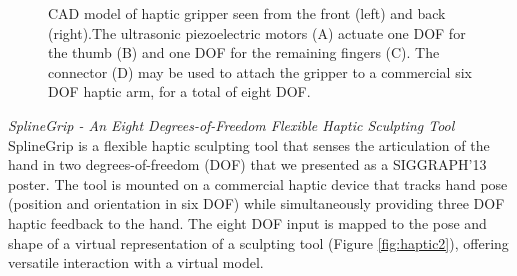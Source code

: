 \begin{enumerate}
{\begin{figure}[!h]
\centering
{}
\caption{\label{fig:haptic1} CAD model of haptic gripper seen from the front (left) and back (right).The ultrasonic piezoelectric motors (A) actuate one DOF for the thumb (B) and one DOF for the remaining fingers (C). The connector (D) may be used to attach the gripper to a commercial six DOF haptic arm, for a total of eight DOF.} 
\end{figure}

\textit{SplineGrip - An Eight Degrees-of-Freedom Flexible Haptic Sculpting Tool} SplineGrip is a flexible haptic sculpting tool that senses the articulation of the hand in two degrees-of-freedom (DOF) that we presented as a SIGGRAPH'13 poster. The tool is mounted on a commercial haptic device that tracks hand pose (position and orientation in six DOF) while simultaneously providing three DOF haptic feedback to the hand. The eight DOF input is mapped to the pose and shape of a virtual representation of a sculpting tool (Figure \ref{fig:haptic2}), offering versatile interaction with a virtual model.

}
\end{enumerate}
